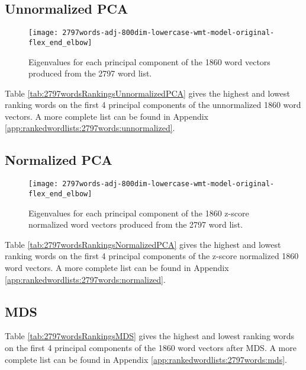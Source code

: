 \subsection{Unnormalized PCA}



\begin{figure}[tbp]
    \texttt{[image: 2797words-adj-800dim-lowercase-wmt-model-original-flex\_end\_elbow]}
    \caption{Eigenvalues for each principal component of the 1860 word vectors
    produced from the 2797 word list.}
    \label{fig:2797wordsunnormalizedpcaeigenvalues}
\end{figure}

Table \ref{tab:2797wordsRankingsUnnormalizedPCA} gives the highest and lowest
ranking words on the first 4 principal components of the unnormalized 1860 word 
vectors. A more complete list can be found in Appendix 
\ref{app:rankedwordlists:2797words:unnormalized}.


\subsection{Normalized PCA}



\begin{figure}[tbp]
    \texttt{[image: 2797words-adj-800dim-lowercase-wmt-model-original-flex\_end\_elbow]}
    \caption{Eigenvalues for each principal component of the 1860 z-score 
    normalized word vectors produced from the 2797 word list.}
    \label{fig:2797wordsnormalizedpcaeigenvalues}
\end{figure}

Table \ref{tab:2797wordsRankingsNormalizedPCA} gives the highest and lowest
ranking words on the first 4 principal components of the z-score normalized 1860
word vectors. A more complete list can be found in Appendix 
\ref{app:rankedwordlists:2797words:normalized}.

\subsection{MDS}



Table \ref{tab:2797wordsRankingsMDS} gives the highest and lowest
ranking words on the first 4 principal components of the 1860 word 
vectors after MDS. A more complete list can be found in Appendix 
\ref{app:rankedwordlists:2797words:mds}.

